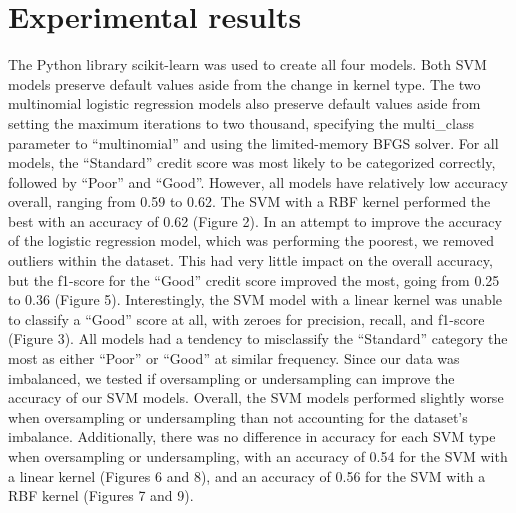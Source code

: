 \documentclass[11pt, twocolumn]{article}
\begin{document}
\section*{Experimental results}
The Python library scikit-learn was used to create all four models. Both SVM models preserve default values aside from the change
in kernel type. The two multinomial logistic regression models also preserve default values aside from setting the maximum iterations
to two thousand, specifying the multi\_class parameter to ``multinomial'' and using the limited-memory BFGS solver.
For all models, the ``Standard'' credit score was most likely to be categorized correctly, followed by ``Poor'' and ``Good''. 
However, all models have relatively low accuracy overall, ranging from 0.59 to 0.62. The SVM with a RBF kernel performed the best with an
accuracy of 0.62 (Figure 2). \vspace{5mm}\newline
In an attempt to improve the accuracy of the logistic regression model, which was performing the poorest, we removed outliers within the dataset.
This had very little impact on the overall accuracy, but the f1-score for the ``Good'' credit score improved the most, going from 0.25 to 0.36 (Figure 5).
Interestingly, the SVM model with a linear kernel was unable to classify a ``Good'' score at all, with zeroes for precision, 
recall, and f1-score (Figure 3). All models had a tendency to misclassify the ``Standard'' category the most as either ``Poor'' or 
``Good'' at similar frequency.\vspace{5mm}\newline
Since our data was imbalanced, we tested if oversampling or undersampling can improve the accuracy of our SVM models. 
Overall, the SVM models performed slightly worse when oversampling or undersampling than not accounting for the dataset's imbalance.
Additionally, there was no difference in accuracy for each SVM type when oversampling or undersampling, with an accuracy of 0.54 for the 
SVM with a linear kernel (Figures 6 and 8), and an accuracy of 0.56 for the SVM with a RBF kernel (Figures 7 and 9).
\end{document}

